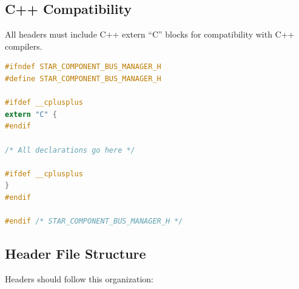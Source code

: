 \subsection{C++ Compatibility}

All headers must include C++ extern ``C'' blocks for compatibility with C++ compilers.

\begin{lstlisting}[language=C]
#ifndef STAR_COMPONENT_BUS_MANAGER_H
#define STAR_COMPONENT_BUS_MANAGER_H

#ifdef __cplusplus
extern "C" {
#endif

/* All declarations go here */

#ifdef __cplusplus
}
#endif

#endif /* STAR_COMPONENT_BUS_MANAGER_H */
\end{lstlisting}

\subsection{Header File Structure}

Headers should follow this organization:

